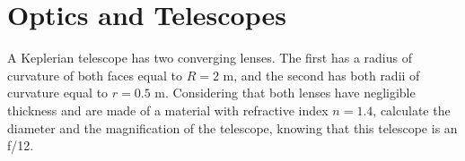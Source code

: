 \documentclass[11pt]{article}
\begin{document}
\newpage

\section{Optics and Telescopes}

    \begin{pproblem} A Keplerian telescope has two converging lenses. The first has a radius of curvature of both faces equal to \(R = 2\text{ m}\), and the second has both radii of curvature equal to \(r = 0.5 \text{ m}\). Considering that both lenses have negligible thickness and are made of a material with refractive index \(n=1.4\), calculate the diameter and the magnification of the telescope, knowing that this telescope is an f/12.
    
    \end{pproblem}
\end{document}
